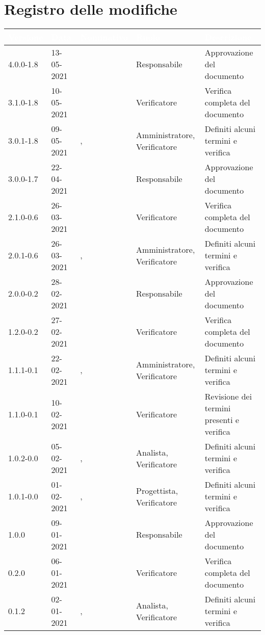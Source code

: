 \section*{Registro delle modifiche}
{
\renewcommand{\arraystretch}{1.5}
\centering
\begin{longtable}{C{1.7cm} | C{2.5cm} | C{3.2cm} | C{2.9cm} | C{4.6cm}}
\textcolor{white}{\textbf{Versione}}&
\textcolor{white}{\textbf{Data}}&
\textcolor{white}{\textbf{Nominativo}}&
\textcolor{white}{\textbf{Ruolo}}&
\textcolor{white}{\textbf{Descrizione}}\\	
\endhead

4.0.0-1.8 & 13-05-2021 & \SP{} & Responsabile & Approvazione del documento\\
3.1.0-1.8 & 10-05-2021 & \BM{} & Verificatore & Verifica completa del documento\\
3.0.1-1.8 & 09-05-2021 & \RA{}, \SG{} & Amministratore, Verificatore & Definiti alcuni termini e verifica\\
3.0.0-1.7 & 22-04-2021 & \RA{} & Responsabile & Approvazione del documento\\
2.1.0-0.6 & 26-03-2021 & \SG{} & Verificatore & Verifica completa del documento\\
2.0.1-0.6 & 26-03-2021 & \SP{}, \SG{} & Amministratore, Verificatore & Definiti alcuni termini e verifica\\
2.0.0-0.2 & 28-02-2021 & \ZM{} & Responsabile & Approvazione del documento \\
1.2.0-0.2 & 27-02-2021 & \SH{} & Verificatore & Verifica completa del documento \\
1.1.1-0.1 & 22-02-2021 & \SP{}, \PA{} & Amministratore, Verificatore & Definiti alcuni termini e verifica\\
1.1.0-0.1 & 10-02-2021 & \PA{} & Verificatore & Revisione dei termini presenti e verifica \\
1.0.2-0.0 & 05-02-2021 & \BM{}, \SH{} & Analista, Verificatore & Definiti alcuni termini e verifica\\
1.0.1-0.0 & 01-02-2021 & \SG{}, \PA{} & Progettista, Verificatore & Definiti alcuni termini e verifica\\
1.0.0 & 09-01-2021 & \SG{} & Responsabile & Approvazione del documento \\
0.2.0 & 06-01-2021 & \BM{} & Verificatore & Verifica completa del documento \\
0.1.2 & 02-01-2021 & \RA{}, \PA{} & Analista, Verificatore & Definiti alcuni termini e verifica \\

\end{longtable}}
